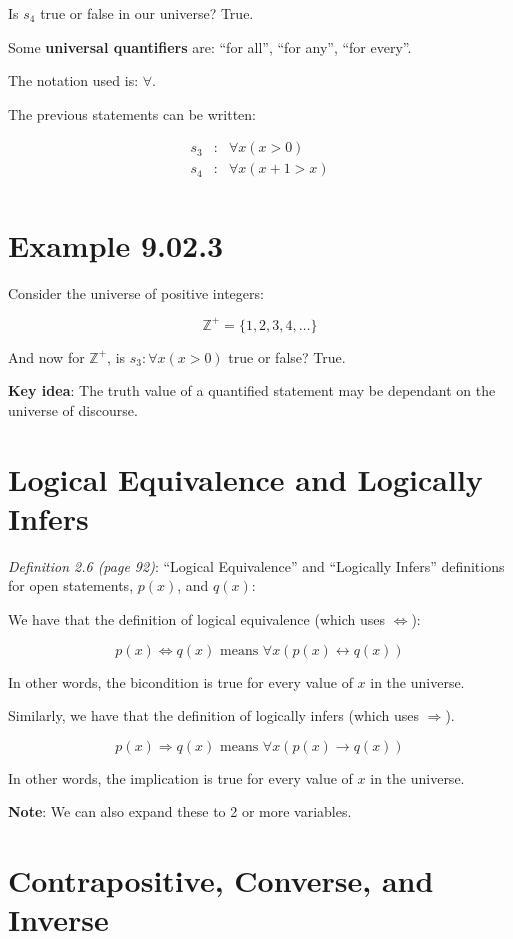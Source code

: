 \documentclass{article}
\begin{document}
Is $s_4$ true or false in our universe? True.

Some \textbf{universal quantifiers} are: ``for all'', ``for any'',
``for every''.

The notation used is: $\forall$.

The previous statements can be written:

\[
\begin{array}{rcl}
s_3 & : & \forall x (x>0) \\
s_4 & : & \forall x (x+1>x) \\
\end{array}
\]

\section*{Example 9.02.3}

Consider the universe of positive integers:

\[
\mathbb{Z}^+ = \{1,2,3,4,\dots\}
\]

And now for $\mathbb{Z}^+$, is $s_3:\forall{}x(x>0)$ true or false? True.

\textbf{Key idea}: The truth value of a quantified statement may be
dependant on the universe of discourse.

\section*{Logical Equivalence and Logically Infers}

\textit{Definition 2.6 (page 92)}: ``Logical Equivalence'' and
``Logically Infers'' definitions for open statements, $p(x)$, and
$q(x)$:

We have that the definition of logical equivalence (which uses
$\Leftrightarrow$):

\[
p(x)\Leftrightarrow q(x)\text{ means } \forall x(p(x)\leftrightarrow q(x))
\]

In other words, the bicondition is true for every value of $x$ in the
universe.

Similarly, we have that the definition of logically infers (which uses
$\Rightarrow$).

\[
p(x)\Rightarrow q(x)\text{ means }\forall x(p(x)\rightarrow q(x))
\]

In other words, the implication is true for every value of $x$ in the universe.

\textbf{Note}: We can also expand these to 2 or more variables.

\section*{Contrapositive, Converse, and Inverse}
\end{document}
